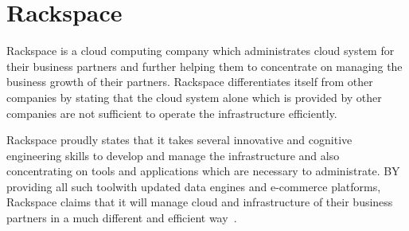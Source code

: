 \section{Rackspace}

Rackspace is a cloud computing company which administrates cloud system for their
business partners and further helping them to concentrate on managing the
business growth of their partners. Rackspace differentiates itself from other
companies by stating that the cloud system alone which is provided by other
companies are not sufficient to operate the infrastructure efficiently.

Rackspace proudly states that it takes several innovative and cognitive
engineering skills to develop and manage the infrastructure and also
concentrating on tools and applications which are necessary to administrate. BY
providing all such toolwith updated data engines and e-commerce platforms,
Rackspace claims that it will manage cloud and infrastructure of their business
partners in a much different and efficient way~\cite{hid-sp18-406-Rackspace}.



 
